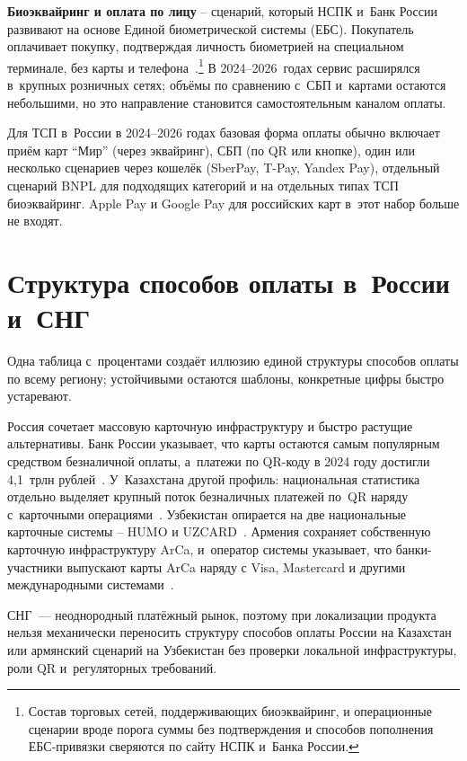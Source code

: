 \textbf{Биоэквайринг и оплата по лицу} -- сценарий, который
НСПК и~Банк России развивают на основе Единой биометрической
системы (ЕБС). Покупатель оплачивает покупку, подтверждая
личность биометрией на специальном терминале, без карты и
телефона~\cite{nspk-biopay-overview,ebs-overview}.\footnote{Состав
торговых сетей, поддерживающих биоэквайринг, и операционные
сценарии вроде порога суммы без подтверждения и способов пополнения
ЕБС-привязки сверяются по сайту НСПК и~Банка России.}
В 2024--2026~годах сервис расширялся в~крупных розничных
сетях; объёмы по сравнению с~СБП и~картами остаются
небольшими, но это направление становится самостоятельным каналом
оплаты.

Для ТСП в~России в 2024--2026 годах базовая форма оплаты обычно
включает приём карт \enquote{Мир} (через эквайринг), СБП (по QR или
кнопке), один или несколько сценариев через кошелёк (SberPay, T-Pay,
Yandex Pay), отдельный сценарий BNPL для подходящих категорий и на
отдельных типах ТСП биоэквайринг. Apple Pay и Google Pay для
российских карт в~этот набор больше не входят.

\section{Структура способов оплаты в~России и~СНГ}\label{sec:payments-mix-cis}

Одна таблица с~процентами создаёт иллюзию единой структуры способов
оплаты по всему региону; устойчивыми остаются шаблоны, конкретные
цифры быстро устаревают.

Россия сочетает массовую карточную инфраструктуру и быстро растущие
альтернативы. Банк России указывает, что карты остаются самым
популярным средством безналичной оплаты, а~платежи по QR-коду
в 2024 году достигли 4{,}1~трлн рублей~\cite{cbr-results-2024-payments}.
У~Казахстана другой профиль: национальная статистика
отдельно выделяет крупный поток безналичных платежей по~QR наряду
с~карточными операциями~\cite{nbk-payment-cards-2025jan}.
Узбекистан опирается на две национальные карточные системы --
HUMO и UZCARD~\cite{humo-faq,uzcard-about}. Армения сохраняет
собственную карточную инфраструктуру ArCa, и~оператор
системы указывает, что банки-участники выпускают карты ArCa
наряду с Visa, Mastercard и другими международными
системами~\cite{arca-about}.

СНГ~--- неоднородный платёжный рынок, поэтому при локализации продукта нельзя
механически переносить структуру способов оплаты России на
Казахстан или армянский сценарий на Узбекистан без проверки локальной
инфраструктуры, роли QR и~регуляторных требований.

